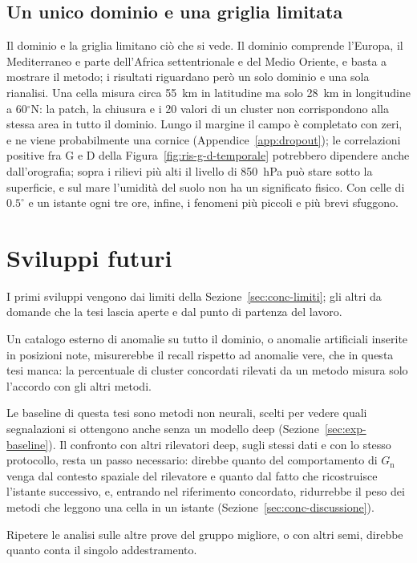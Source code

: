 \subsection{Un unico dominio e una griglia limitata}
\label{sec:conc-limite-dominio}
Il dominio e la griglia limitano ciò che si vede. Il dominio comprende l'Europa, il Mediterraneo e parte dell'Africa settentrionale e del Medio Oriente, e basta a mostrare il metodo; i risultati riguardano però un solo dominio e una sola rianalisi. Una cella misura circa 55~km in latitudine ma solo 28~km in longitudine a 60$^\circ$N: la patch, la chiusura e i 20 valori di un cluster non corrispondono alla stessa area in tutto il dominio. Lungo il margine il campo è completato con zeri, e ne viene probabilmente una cornice (Appendice~\ref{app:dropout}); le correlazioni positive fra G e D della Figura~\ref{fig:ris-g-d-temporale} potrebbero dipendere anche dall'orografia; sopra i rilievi più alti il livello di 850~hPa può stare sotto la superficie, e sul mare l'umidità del suolo non ha un significato fisico. Con celle di $0.5^\circ$ e un istante ogni tre ore, infine, i fenomeni più piccoli e più brevi sfuggono.

\section{Sviluppi futuri}
\label{sec:conc-sviluppi}

I primi sviluppi vengono dai limiti della Sezione~\ref{sec:conc-limiti}; gli altri da domande che la tesi lascia aperte e dal punto di partenza del lavoro.

Un catalogo esterno di anomalie su tutto il dominio, o anomalie artificiali inserite in posizioni note, misurerebbe il recall rispetto ad anomalie vere, che in questa tesi manca: la percentuale di cluster concordati rilevati da un metodo misura solo l'accordo con gli altri metodi.

Le baseline di questa tesi sono metodi non neurali, scelti per vedere quali segnalazioni si ottengono anche senza un modello deep (Sezione~\ref{sec:exp-baseline}). Il confronto con altri rilevatori deep, sugli stessi dati e con lo stesso protocollo, resta un passo necessario: direbbe quanto del comportamento di $G_{\mathrm{n}}$ venga dal contesto spaziale del rilevatore e quanto dal fatto che ricostruisce l'istante successivo, e, entrando nel riferimento concordato, ridurrebbe il peso dei metodi che leggono una cella in un istante (Sezione~\ref{sec:conc-discussione}).

Ripetere le analisi sulle altre prove del gruppo migliore, o con altri semi, direbbe quanto conta il singolo addestramento.

